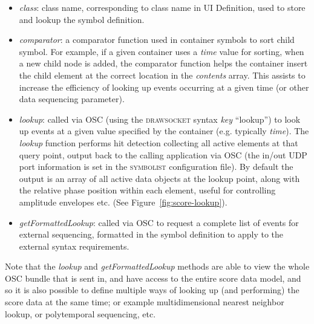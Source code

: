 \documentclass{article}
\def\symbolist{\textsc{symbolist}\xspace}
\def\drawsocket{\textsc{drawsocket}\xspace}
\begin{document}
\begin{itemize}\itemsep0pt 
\item \textit{class}: class name, corresponding to class name in UI Definition, used to store and lookup the symbol definition.

\item \textit{comparator}: a comparator function used in container symbols to sort child symbol. For example, if a given container uses a \textit{time} value for sorting, when a new child node is added, the comparator function helps the container insert the child element at the correct location in the \textit{contents} array. This assists to increase the efficiency of looking up events occurring at a given time (or other data sequencing parameter).

\item \textit{lookup}: called via OSC (using the \drawsocket syntax \textit{key} ``lookup'') to look up events at a given value specified by the container (e.g. typically \textit{time}). The \textit{lookup} function performs hit detection collecting all active elements at that query point, output back to the calling application via OSC (the in/out UDP port information is set in the \symbolist configuration file). By default the output is an array of all active data objects at the lookup point, along with the relative phase position within each element, useful for controlling amplitude envelopes etc. (See Figure~\ref{fig:score-lookup}).

\item \textit{getFormattedLookup}: called via OSC to request a complete list of events for external sequencing, formatted in the symbol definition to apply to the external syntax requirements.

\end{itemize}

Note that the \textit{lookup} and \textit{getFormattedLookup} methods are able to view the whole OSC bundle that is sent in, and have access to the entire score data model, and so it is also possible to define multiple ways of looking up (and performing) the score data at the same time; or example multidimensional nearest neighbor lookup, or polytemporal sequencing, etc.

\end{document}
